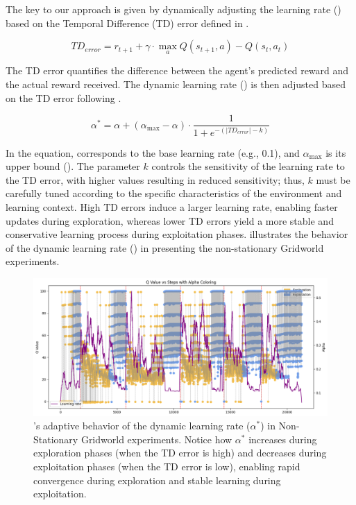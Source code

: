 The key to our approach is given by dynamically adjusting the learning rate (\lrate{\alpha}) based on 
the Temporal Difference (TD) error defined in .

\begin{equation} \label{eq:td_error}
    TD_{error} = r_{t+1} + \gamma \cdot \underset{a}{\max} Q(s_{t+1}, a) - Q(s_t, a_t)
\end{equation}

The TD error quantifies the difference between the agent's predicted reward and the actual reward 
received. The dynamic learning rate (\lrate{\alpha^*}) is then adjusted based on the TD error following  
.

\begin{equation}
    \label{eq:dynamic_learning_rate}
    \alpha^* = \alpha + (\alpha_{\max}-\alpha) \cdot \frac{1}{1 + e^{-(|TD_{error}|-k)}}
\end{equation}

In the equation, \lrate{\alpha} corresponds to the base learning rate (e.g., 0.1), and $\alpha_{\max}$ is its upper bound (). The parameter $k$ controls the sensitivity of the learning rate to the TD error, with higher values resulting in reduced sensitivity; thus, $k$ must be carefully tuned according to the specific characteristics of the environment and learning context. High TD errors induce a larger learning rate, enabling faster updates during exploration, whereas lower TD errors yield a more stable and conservative learning process during exploitation phases.  illustrates the behavior of the dynamic learning rate (\lrate{\alpha^*}) in  presenting the non-stationary Gridworld experiments. 

\begin{figure}
    \centering
    \includegraphics[width=\textwidth]{figures/alpha.png}
    \caption{\adaptiverl's adaptive behavior of the dynamic learning rate ($\alpha^*$) in Non-Stationary Gridworld experiments. Notice how $\alpha^*$ increases during exploration phases (when the TD error is high) and decreases during exploitation phases (when the TD error is low), enabling rapid convergence during exploration and stable learning during exploitation.}
    \label{fig:alpha}
\end{figure}

